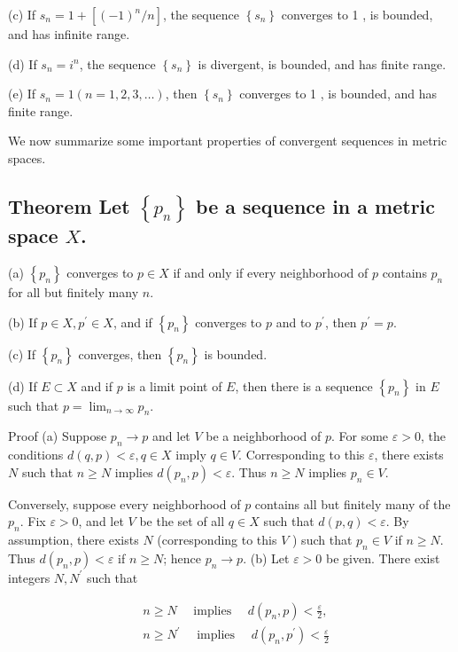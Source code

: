 \documentclass[10pt]{article}
\begin{document}
(c) If $s_{n}=1+\left[(-1)^{n} / n\right]$, the sequence $\left\{s_{n}\right\}$ converges to 1 , is bounded, and has infinite range.

(d) If $s_{n}=i^{n}$, the sequence $\left\{s_{n}\right\}$ is divergent, is bounded, and has finite range.

(e) If $s_{n}=1(n=1,2,3, \ldots)$, then $\left\{s_{n}\right\}$ converges to 1 , is bounded, and has finite range.

We now summarize some important properties of convergent sequences in metric spaces.

\subsection{Theorem Let $\left\{p_{n}\right\}$ be a sequence in a metric space $X$.}
(a) $\left\{p_{n}\right\}$ converges to $p \in X$ if and only if every neighborhood of $p$ contains $p_{n}$ for all but finitely many $n$.

(b) If $p \in X, p^{\prime} \in X$, and if $\left\{p_{n}\right\}$ converges to $p$ and to $p^{\prime}$, then $p^{\prime}=p$.

(c) If $\left\{p_{n}\right\}$ converges, then $\left\{p_{n}\right\}$ is bounded.

(d) If $E \subset X$ and if $p$ is a limit point of $E$, then there is a sequence $\left\{p_{n}\right\}$ in $E$ such that $p=\lim _{n \rightarrow \infty} p_{n}$.

Proof (a) Suppose $p_{n} \rightarrow p$ and let $V$ be a neighborhood of $p$. For some $\varepsilon>0$, the conditions $d(q, p)<\varepsilon, q \in X$ imply $q \in V$. Corresponding to this $\varepsilon$, there exists $N$ such that $n \geq N$ implies $d\left(p_{n}, p\right)<\varepsilon$. Thus $n \geq N$ implies $p_{n} \in V$.

Conversely, suppose every neighborhood of $p$ contains all but finitely many of the $p_{n}$. Fix $\varepsilon>0$, and let $V$ be the set of all $q \in X$ such that $d(p, q)<\varepsilon$. By assumption, there exists $N$ (corresponding to this $V$ ) such that $p_{n} \in V$ if $n \geq N$. Thus $d\left(p_{n}, p\right)<\varepsilon$ if $n \geq N$; hence $p_{n} \rightarrow p$.
(b) Let $\varepsilon>0$ be given. There exist integers $N, N^{\prime}$ such that

$$
\begin{aligned}
& n \geq N \quad \text { implies } \quad d\left(p_{n}, p\right)<\frac{\varepsilon}{2}, \\
& n \geq N^{\prime} \quad \text { implies } \quad d\left(p_{n}, p^{\prime}\right)<\frac{\varepsilon}{2}
\end{aligned}
$$
\end{document}
